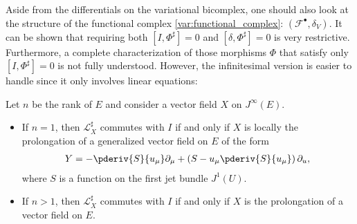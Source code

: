     Aside from the differentials on the variational bicomplex, one should also look at the structure of the functional complex \eqref{var:functional_complex}: $(\mathcal{F}^\bullet,\delta_V)$. It can be shown that requiring both $[I,\Phi^\sharp]=0$ and $[\delta,\Phi^\sharp]=0$ is very restrictive. Furthermore, a complete characterization of those morphisms $\Phi$ that satisfy only $[I,\Phi^\sharp]=0$ is not fully understood. However, the infinitesimal version is easier to handle since it only involves linear equations:
    \begin{property}
        Let $n$ be the rank of $E$ and consider a vector field $X$ on $J^\infty(E)$.
        \begin{itemize}
            \item If $n=1$, then $\mathcal{L}^\sharp_X$ commutes with $I$ if and only if $X$ is locally the prolongation of a generalized vector field on $E$ of the form
            \begin{gather}
                Y = -\pderiv{S}{u_\mu}\partial_\mu + \left(S - u_\mu\pderiv{S}{u_\mu}\right)\partial_u,
            \end{gather}
            where $S$ is a function on the first jet bundle $J^1(U)$.
            \item If $n>1$, then $\mathcal{L}^\sharp_X$ commutes with $I$ if and only if $X$ is the prolongation of a vector field on $E$.
        \end{itemize}
    \end{property}

